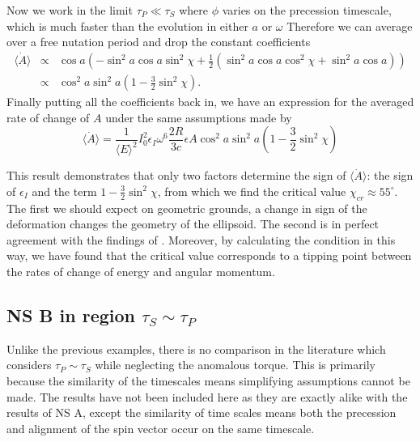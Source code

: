 \documentclass[../full_thesis/full_thesis.tex]{subfiles}
\begin{document}
Now we work in the limit $\tau_P \ll \tau_S$ where $\phi$ varies on the 
precession timescale, which is much faster than the evolution in either $a$ or $\omega$
Therefore we can average over a free nutation period and drop the constant
coefficients
\begin{eqnarray*}
\langle\dot{A}\rangle &\propto& \cos a \left(-\sin^{2}a\cos a \sin^{2}\chi + 
       \frac{1}{2}\left(\sin^{2}a\cos a \cos^{2}\chi + 
       \sin^{2}a \cos a \right) \right) \\
& \propto& \cos^{2} a \sin^{2}a\left(1-\frac{3}{2}\sin^{2}\chi\right).
\end{eqnarray*}
Finally putting all the coefficients back in, we have an expression for the averaged
rate of change of $A$ under the same assumptions made by \citet{Goldreich1970}
\begin{equation}
\langle \dot{A} \rangle =\frac{1}{\langle E\rangle ^{2}}I_{0}^{2}
                         \epsilon_{I}\omega^{6}\frac{2R}{3c}\epsilon{A} 
                         \cos^{2} a \sin^{2}a
                         \left(1-\frac{3}{2}\sin^{2}\chi\right) 
\end{equation}

This result demonstrates that only two factors determine the sign of
$\langle\dot{A}\rangle$: the sign of $\epsilon_{I}$ and the term
$1-\frac{3}{2}\sin^{2}\chi$, from which we find the critical value
$\chi_{cr}\approx55^\circ$.  The first we should expect on geometric grounds, a
change in sign of the deformation changes the geometry of the ellipsoid. The
second is in perfect agreement with the findings of \citet{Goldreich1970}.
Moreover, by calculating the condition in this way, we have found that the
critical value corresponds to a tipping point between the rates of change of
energy and angular momentum.

\FloatBarrier
\subsection{NS B in region \texorpdfstring{$\tau_{S}\sim \tau_{P}$}{}}
\label{sec: B_NA}
Unlike the previous examples, there is no comparison in the literature which
considers $\tau_{P}\sim\tau_{S}$ while neglecting the anomalous torque. This is
primarily because the similarity of the timescales means simplifying
assumptions cannot be made. The results have not been included here as they are
exactly alike with the results of NS A, except the similarity of time
scales means both the precession and alignment of the spin vector occur on the
same timescale.
\end{document}
